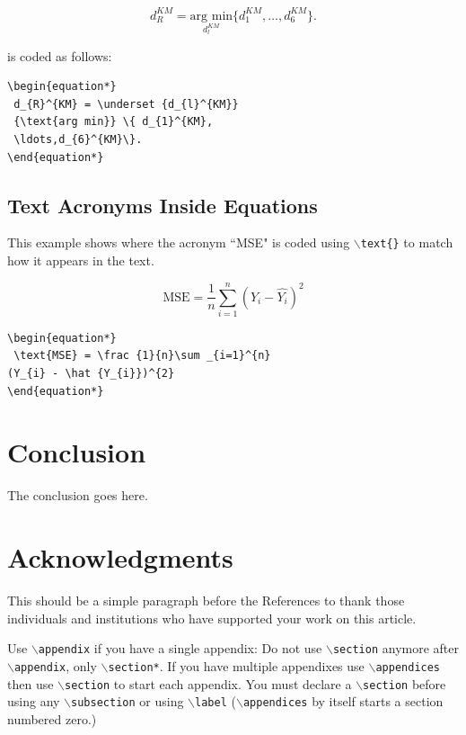 \documentclass[lettersize,journal]{IEEEtran}
\begin{document}
\begin{equation*}
  d_{R}^{KM} = \underset {d_{l}^{KM}} {\text{arg min}} \{ d_{1}^{KM},\ldots,d_{6}^{KM}\}.
\end{equation*}

\noindent is coded as follows:
\begin{verbatim}
\begin{equation*}
 d_{R}^{KM} = \underset {d_{l}^{KM}}
 {\text{arg min}} \{ d_{1}^{KM},
 \ldots,d_{6}^{KM}\}.
\end{equation*}
\end{verbatim}

\subsection{ Text Acronyms Inside Equations}
This example shows where the acronym ``MSE" is coded using $\backslash${\tt{text\{\}}} to match how it appears in the text.

\begin{equation*}
 \text{MSE} = \frac {1}{n}\sum _{i=1}^{n}(Y_{i} - \hat {Y_{i}})^{2}
\end{equation*}

\begin{verbatim}
\begin{equation*}
 \text{MSE} = \frac {1}{n}\sum _{i=1}^{n}
(Y_{i} - \hat {Y_{i}})^{2}
\end{equation*}
\end{verbatim}

\section{Conclusion}
The conclusion goes here.


\section*{Acknowledgments}
This should be a simple paragraph before the References to thank those individuals and institutions who have supported your work on this article.



{
Use $\backslash${\tt{appendix}} if you have a single appendix:
Do not use $\backslash${\tt{section}} anymore after $\backslash${\tt{appendix}}, only $\backslash${\tt{section*}}.
If you have multiple appendixes use $\backslash${\tt{appendices}} then use $\backslash${\tt{section}} to start each appendix.
You must declare a $\backslash${\tt{section}} before using any $\backslash${\tt{subsection}} or using $\backslash${\tt{label}} ($\backslash${\tt{appendices}} by itself
 starts a section numbered zero.)}
\end{document}
